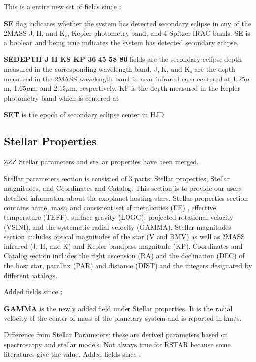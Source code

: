\documentclass[11pt,preprint]{aastex}
\def\micron{$\mu$m}
\def\micron{$\mu$m}
\begin{document}
\begin{CJK*}{UTF8}{gbsn}
This is a entire new set of fields since \cite{Wright2011}:

{\bf SE} flag indicates whether the system has detected secondary eclipse in any of the 2MASS J, H, and K$_s$, Kepler photometry band, and 4 Spitzer IRAC bands. SE is a boolean and being true indicates the system has detected secondary eclipse. 

{\bf SEDEPTH J H KS KP 36 45 58 80} fields are the secondary eclipse depth measured in the corresponding wavelength band. J, K, and K$_s$ are the depth measured in the 2MASS wavelength band in near infrared each centered at 1.25\micron, 1.65\micron, and 2.15\micron, respectively. KP is the depth measured in the Kepler photometry band which is centered at 

{\bf SET} is the epoch of secondary eclipse center in HJD. 


\subsection{Stellar Properties}
ZZZ Stellar parameters and stellar properties have been merged. 

Stellar parameters section is consisted of 3 parts: Stellar properties, Stellar magnitudes, and Coordinates and Catalog. This section is to provide our users detailed information about the exoplanet hosting stars. Stellar properties section contains name, mass, and consistent set of metalicities (FE) , effective temperature (TEFF), surface gravity (LOGG), projected rotational velocity (VSINI), and the systematic radial velocity (GAMMA). Stellar magnitudes section includes optical magnitudes of the star (V and BMV) as well as 2MASS infrared (J, H, and K) and Kepler bandpass magnitude (KP). Coordinates and Catalog section includes the right ascension (RA) and the declination (DEC) of the host star, parallax (PAR) and distance (DIST) and the integers designated by different catalogs. 

Added fields since \cite{Wright2011}:


{\bf GAMMA} is the newly added field under Stellar properties. It is the radial velocity of the center of mass of the planetary system and is reported in km/s.  


Difference from Stellar Parameters: these are derived parameters based
on spectroscopy and stellar models. 
Not always true for RSTAR because some literatures give the value. 
Added fields since \cite{Wright2011}:


\end{CJK*}
\end{document}
